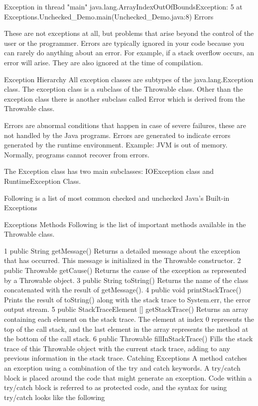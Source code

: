 Exception in thread "main" java.lang.ArrayIndexOutOfBoundsException: 5
    at Exceptions.Unchecked_Demo.main(Unchecked_Demo.java:8)
Errors

These are not exceptions at all, but problems that arise beyond the control of the user or the programmer. Errors are typically ignored in your code because you can rarely do anything about an error. For example, if a stack overflow occurs, an error will arise. They are also ignored at the time of compilation.

Exception Hierarchy
All exception classes are subtypes of the java.lang.Exception class. The exception class is a subclass of the Throwable class. Other than the exception class there is another subclass called Error which is derived from the Throwable class.

Errors are abnormal conditions that happen in case of severe failures, these are not handled by the Java programs. Errors are generated to indicate errors generated by the runtime environment. Example: JVM is out of memory. Normally, programs cannot recover from errors.

The Exception class has two main subclasses: IOException class and RuntimeException Class.



Following is a list of most common checked and unchecked Java's Built-in Exceptions

Exceptions Methods
Following is the list of important methods available in the Throwable class.

1	public String getMessage()
Returns a detailed message about the exception that has occurred. This message is initialized in the Throwable constructor.
2	public Throwable getCause()
Returns the cause of the exception as represented by a Throwable object.
3	public String toString()
Returns the name of the class concatenated with the result of getMessage().
4	public void printStackTrace()
Prints the result of toString() along with the stack trace to System.err, the error output stream.
5	public StackTraceElement [] getStackTrace()
Returns an array containing each element on the stack trace. The element at index 0 represents the top of the call stack, and the last element in the array represents the method at the bottom of the call stack.
6	public Throwable fillInStackTrace()
Fills the stack trace of this Throwable object with the current stack trace, adding to any previous information in the stack trace.
Catching Exceptions
A method catches an exception using a combination of the try and catch keywords. A try/catch block is placed around the code that might generate an exception. Code within a try/catch block is referred to as protected code, and the syntax for using try/catch looks like the following

